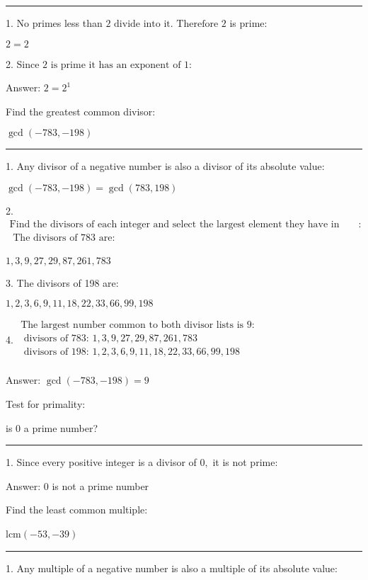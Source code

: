 \documentclass{article}
\begin{document}
\hrule

1. No primes less than $2\text{ divide into it. Therefore }2$ is prime:

$2=2$

2. Since $2\text{ is prime it has an exponent of }1:$

Answer: $2=2^1$

\pagebreak

Find the greatest common divisor:

$\gcd (-783,-198)$

\hrule

1. Any divisor of a negative number is also a divisor of its absolute value:

$\gcd (-783,-198)=\gcd (783,198)$

2. $\begin{array}{l}
\text{Find the divisors of each integer and select the largest element they have in common}: \\
\text{ The divisors of 783 are}: \\
\end{array}$

$1,3,9,27,29,87,261,783$

3. The divisors of 198 are:

$1,2,3,6,9,11,18,22,33,66,99,198$

4. $\begin{array}{l}
\text{The largest number common to both divisor lists is }9: \\
\text{ divisors of 783: }1,3,9,27,29,87,261,783 \\
\text{ divisors of 198: }1,2,3,6,9,11,18,22,33,66,99,198 \\
\end{array}$

Answer: $\gcd (-783,-198)=9$

\pagebreak

Test for primality:

is $0$ a prime number?

\hrule

1. Since every positive integer is a divisor of $0,$ it is not prime:

Answer: $0$ is not a prime number

\pagebreak

Find the least common multiple:

lcm$(-53,-39)$

\hrule

1. Any multiple of a negative number is also a multiple of its absolute value:
\end{document}
